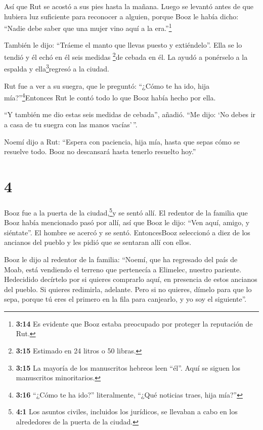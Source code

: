  Así que Rut se acostó a sus pies hasta la mañana. Luego se
levantó antes de que hubiera luz suficiente para reconocer a alguien,
porque Booz le había dicho: ``Nadie debe saber que una mujer vino aquí a
la era.''\footnote{\textbf{3:14} Es evidente que Booz estaba preocupado
  por proteger la reputación de Rut.}

 También le dijo: ``Tráeme el manto que llevas puesto y
extiéndelo''. Ella se lo tendió y él echó en él seis medidas
\footnote{\textbf{3:15} Estimado en 24 litros o 50 libras.}de cebada en
él. La ayudó a ponérselo a la espalda y ella\footnote{\textbf{3:15} La
  mayoría de los manuscritos hebreos leen ``él''. Aquí se siguen los
  manuscritos minoritarios.}regresó a la ciudad.

 Rut fue a ver a su suegra, que le preguntó: ``¿Cómo te ha
ido, hija mía?''\footnote{\textbf{3:16} ``¿Cómo te ha ido?''
  literalmente, ``¿Qué noticias traes, hija mía?''}Entonces Rut le contó
todo lo que Booz había hecho por ella.

 ``Y también me dio estas seis medidas de cebada'', añadió.
``Me dijo: `No debes ir a casa de tu suegra con las manos vacías'\,''.

 Noemí dijo a Rut: ``Espera con paciencia, hija mía, hasta
que sepas cómo se resuelve todo. Booz no descansará hasta tenerlo
resuelto hoy.''

\hypertarget{section-3}{%
\section{4}\label{section-3}}

 Booz fue a la puerta de la ciudad,\footnote{\textbf{4:1}
  Los asuntos civiles, incluidos los jurídicos, se llevaban a cabo en
  los alrededores de la puerta de la ciudad.}y se sentó allí. El
redentor de la familia que Booz había mencionado pasó por allí, así que
Booz le dijo: ``Ven aquí, amigo, y siéntate''. El hombre se acercó y se
sentó.  EntoncesBooz seleccionó a diez de los ancianos del
pueblo y les pidió que se sentaran allí con ellos.

 Booz le dijo al redentor de la familia: ``Noemí, que ha
regresado del país de Moab, está vendiendo el terreno que pertenecía a
Elimelec, nuestro pariente.  Hedecidido decírtelo por si
quieres comprarlo aquí, en presencia de estos ancianos del pueblo. Si
quieres redimirla, adelante. Pero si no quieres, dímelo para que lo
sepa, porque tú eres el primero en la fila para canjearlo, y yo soy el
siguiente''.

